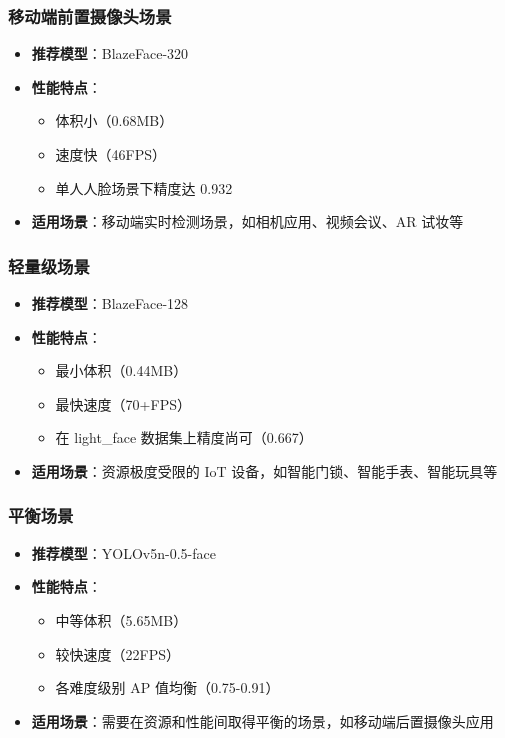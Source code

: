 \documentclass{article}
\begin{document}
\subsubsection{移动端前置摄像头场景}
\begin{itemize}
    \item \textbf{推荐模型}：BlazeFace-320
    \item \textbf{性能特点}：
    \begin{itemize}
        \item 体积小（0.68MB）
        \item 速度快（46FPS）
        \item 单人人脸场景下精度达 0.932
    \end{itemize}
    \item \textbf{适用场景}：移动端实时检测场景，如相机应用、视频会议、AR 试妆等
\end{itemize}

\subsubsection{轻量级场景}
\begin{itemize}
    \item \textbf{推荐模型}：BlazeFace-128
    \item \textbf{性能特点}：
    \begin{itemize}
        \item 最小体积（0.44MB）
        \item 最快速度（70+FPS）
        \item 在 light\_face 数据集上精度尚可（0.667）
    \end{itemize}
    \item \textbf{适用场景}：资源极度受限的 IoT 设备，如智能门锁、智能手表、智能玩具等
\end{itemize}

\subsubsection{平衡场景}
\begin{itemize}
    \item \textbf{推荐模型}：YOLOv5n-0.5-face
    \item \textbf{性能特点}：
    \begin{itemize}
        \item 中等体积（5.65MB）
        \item 较快速度（22FPS）
        \item 各难度级别 AP 值均衡（0.75-0.91）
    \end{itemize}
    \item \textbf{适用场景}：需要在资源和性能间取得平衡的场景，如移动端后置摄像头应用
\end{itemize}
\end{document}
